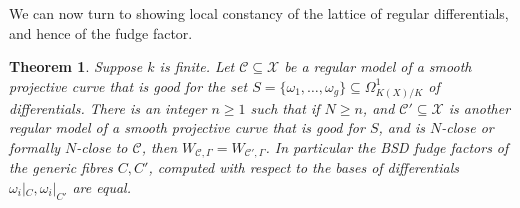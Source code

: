 \documentclass{article}
\theoremstyle{definition}
\theoremstyle{plain}
\newtheorem{thm}[defn]{Theorem}
\theoremstyle{remark}
\begin{document}
	We can now turn to showing local constancy of the lattice of regular differentials, and hence of the fudge factor.
	\begin{thm}\label{lattice_local_constancy}
		Suppose $k$ is finite. Let $\mathcal{C}\subseteq \mathcal{X}$ be a regular model of a smooth projective curve that is good for the set $S = \{\omega_1, \ldots, \omega_g\}\subseteq \Omega^1_{K(X)/K}$ of differentials. There is an integer $n\ge 1$ such that if $N\ge n$, and $\mathcal{C}'\subseteq \mathcal{X}$ is another regular model of a smooth projective curve that is good for $S$, and is $N$-close or formally $N$-close to $\mathcal{C}$, then $W_{\mathcal{C}, \Gamma} = W_{\mathcal{C}', \Gamma}$. In particular the BSD fudge factors of the generic fibres $C,C'$, computed with respect to the bases of differentials $\omega_i|_C, \omega_i|_{C'}$ are equal.
	\end{thm}
\end{document}
